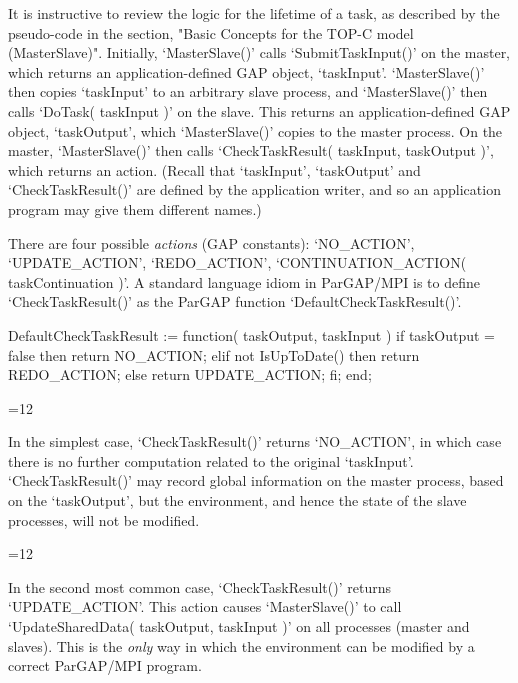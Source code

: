 
It is instructive to review the logic for the lifetime of a task, as
described by the pseudo-code in the section, "Basic Concepts
for the TOP-C model (MasterSlave)".  Initially, `MasterSlave()'
calls `SubmitTaskInput()' on the
master, which returns an application-defined GAP object, `taskInput'.
`MasterSlave()' then copies `taskInput' to an arbitrary slave
process, and `MasterSlave()' then calls
`DoTask( taskInput )' on the slave.  This returns an
application-defined GAP object,
`taskOutput', which
`MasterSlave()' copies to the master process.  On the master,
`MasterSlave()' then calls
`CheckTaskResult( taskInput, taskOutput )',
which returns an action.  (Recall that `taskInput', `taskOutput' and
`CheckTaskResult()' are defined by the application writer,
and so an application program may give them different names.)

There are four possible {\it actions} (GAP constants): `NO_ACTION',
`UPDATE_ACTION', `REDO_ACTION',
`CONTINUATION_ACTION( taskContinuation )'.
A standard language idiom in ParGAP/MPI is to define
`CheckTaskResult()' as the ParGAP function `DefaultCheckTaskResult()'.

\begintt
DefaultCheckTaskResult := function( taskOutput, taskInput )
  if taskOutput = false then return NO_ACTION;
  elif not IsUpToDate() then return REDO_ACTION;
  else return UPDATE_ACTION;
  fi;
end;
\endtt

{=12
\par}

In the simplest case, `CheckTaskResult()' returns `NO_ACTION', in which
case there is no further computation related to the original
`taskInput'.  `CheckTaskResult()' may record global information on the
master process, based on the `taskOutput', but the environment, and
hence the state of the slave processes, will not be modified.

{=12
\par}

In the second most common case, `CheckTaskResult()'
returns `UPDATE_ACTION'. This action causes `MasterSlave()'
to call
`UpdateSharedData( taskOutput, taskInput )'
on all processes (master and slaves).  This is the {\it only} way in
which the environment can be modified by a correct ParGAP/MPI program.

